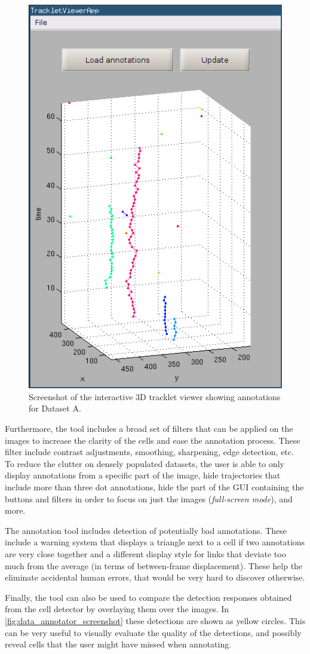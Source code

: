 		\begin{figure}
			\centering
			\includegraphics[width=.48\textwidth]{images/data_tracklet_viewer}
			\caption{Screenshot of the interactive 3D tracklet viewer showing annotations for Dataset A.}
			\label{fig:data_tracklet_viewer}
			
		\end{figure}
				
						
		Furthermore, the tool includes a broad set of filters that can be applied on the images to increase the clarity of the cells and ease the annotation process. These filter include contrast adjustments, smoothing, sharpening, edge detection, etc. To reduce the clutter on densely populated datasets, the user is able to only display annotations from a specific part of the image, hide trajectories that include more than three dot annotations, hide the part of the GUI containing the buttons and filters in order to focus on just the images (\textit{full-screen mode}), and more.
		
		The annotation tool includes detection of potentially bad annotations. These include a warning system that displays a triangle next to a cell if two annotations are very close together and a different display style for links that deviate too much from the average (in terms of between-frame displacement). These help the eliminate accidental human errors, that would be very hard to discover otherwise.


		Finally, the tool can also be used to compare the detection responses obtained from the cell detector by overlaying them over the images. In \cref{fig:data_annotator_screenshot} these detections are shown as yellow circles. This can be very useful to visually evaluate the quality of the detections, and possibly reveal cells that the user might have missed when annotating.
		

